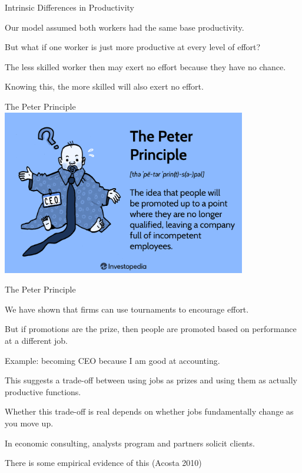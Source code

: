 \documentclass[aspectratio=169,usenames,dvipsnames]{beamer}
\newenvironment{wideitemize}{\itemize\addtolength{\itemsep}{10pt}}{\enditemize}
\begin{document}
\begin{frame}{Intrinsic Differences in Productivity}
    \begin{wideitemize}
        \item Our model assumed both workers had the same base productivity.
        \item But what if one worker is just more productive at every level of effort?
        \item The less skilled worker then may exert no effort because they have no chance.
        \item Knowing this, the more skilled will also exert no effort.
    \end{wideitemize}
\end{frame}
\begin{frame}[c]{The Peter Principle}
\centering
\includegraphics[width=0.8\textwidth]{pictures/peter-principle.asp-final-556adb51ee7f45098cbd12bb1ce4f44e.png}
    
\end{frame}



\begin{frame}{The Peter Principle}
\begin{wideitemize}
    \item We have shown that firms can use tournaments to encourage effort.
    \item But if promotions are the prize, then people are promoted based on performance at a different job.
    \item Example: becoming CEO because I am good at accounting.
    \item This suggests a trade-off between using jobs as prizes and using them as actually productive functions.
    \item Whether this trade-off is real depends on whether jobs fundamentally change as you move up.
    \item In economic consulting, analysts program and partners solicit clients.
    \item There is some empirical evidence of this (Acosta 2010)
\end{wideitemize}
\end{frame}
\end{document}

